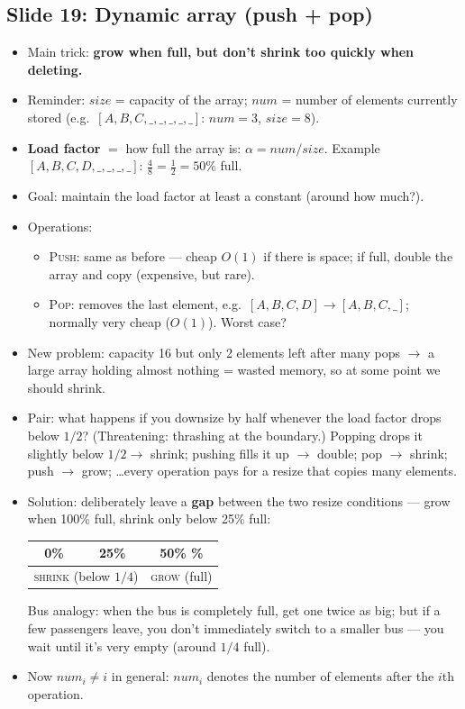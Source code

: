 \documentclass[11pt]{article}
\newcommand{\slide}[2]{\subsection*{Slide #1: #2}}
\begin{document}
\slide{19}{Dynamic array (push + pop)}
\begin{itemize}
  \item Main trick: \textbf{grow when full, but don't shrink too quickly when deleting.}
  \item Reminder: $size$ = capacity of the array; $num$ = number of elements currently stored (e.g.\ $[A,B,C,\_,\_,\_,\_,\_]$: $num = 3$, $size = 8$).
  \item \textbf{Load factor} $=$ how full the array is: $\alpha = num/size$. Example $[A,B,C,D,\_,\_,\_,\_]$: $\tfrac48 = \tfrac12 = 50\%$ full.
  \item Goal: maintain the load factor at least a constant (around how much?).
  \item Operations:
  \begin{itemize}
    \item \textsc{Push}: same as before --- cheap $O(1)$ if there is space; if full, double the array and copy (expensive, but rare).
    \item \textsc{Pop}: removes the last element, e.g.\ $[A,B,C,D] \to [A,B,C,\_]$; normally very cheap ($O(1)$). Worst case?
  \end{itemize}
  \item New problem: capacity 16 but only 2 elements left after many pops $\to$ a large array holding almost nothing = wasted memory, so at some point we should shrink.
  \item Pair: what happens if you downsize by half whenever the load factor drops below $1/2$? (Threatening: thrashing at the boundary.) Popping drops it slightly below $1/2 \to$ shrink; pushing fills it up $\to$ double; pop $\to$ shrink; push $\to$ grow; \ldots every operation pays for a resize that copies many elements.
  \item Solution: deliberately leave a \textbf{gap} between the two resize conditions --- grow when 100\% full, shrink only below 25\% full:
        \begin{center}
        \begin{tabular}{ccc}
          0\% & 25\% & 50\% \quad\quad 100\% \\
          \hline
          \multicolumn{2}{c}{\textsc{shrink} (below $1/4$)} & \textsc{grow} (full) \\
        \end{tabular}
        \end{center}
        Bus analogy: when the bus is completely full, get one twice as big; but if a few passengers leave, you don't immediately switch to a smaller bus --- you wait until it's very empty (around $1/4$ full).
  \item Now $num_i \ne i$ in general: $num_i$ denotes the number of elements after the $i$th operation.
\end{itemize}
\end{document}
